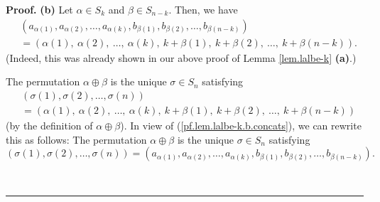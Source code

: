\documentclass
[numbers=enddot,12pt,final,onecolumn,notitlepage,english]{scrartcl}%
\theoremstyle{definition}
\newenvironment{proof}[1][Proof]{\noindent\textbf{#1.} }{\ \rule{0.5em}{0.5em}}
\newenvironment{verlong}{}{}
\begin{document}
\begin{verlong}
\begin{proof}
\textbf{(b)} Let $\alpha\in S_{k}$ and $\beta\in S_{n-k}$. Then, we have%
\begin{align}
&  \left(  a_{\alpha\left(  1\right)  },a_{\alpha\left(  2\right)  }%
,\ldots,a_{\alpha\left(  k\right)  },b_{\beta\left(  1\right)  }%
,b_{\beta\left(  2\right)  },\ldots,b_{\beta\left(  n-k\right)  }\right)
\nonumber\\
&  =\left(  \alpha\left(  1\right)  ,\ \alpha\left(  2\right)  ,\ \ldots
,\ \alpha\left(  k\right)  ,\ k+\beta\left(  1\right)  ,\ k+\beta\left(
2\right)  ,\ \ldots,\ k+\beta\left(  n-k\right)  \right)  .
\label{pf.lem.lalbe-k.b.concats}%
\end{align}
(Indeed, this was already shown in our above proof of Lemma \ref{lem.lalbe-k}
\textbf{(a)}.)

The permutation $\alpha\oplus\beta$ is the unique $\sigma\in S_{n}$ satisfying%
\begin{align*}
&  \left(  \sigma\left(  1\right)  ,\sigma\left(  2\right)  ,\ldots
,\sigma\left(  n\right)  \right) \\
&  =\left(  \alpha\left(  1\right)  ,\ \alpha\left(  2\right)  ,\ \ldots
,\ \alpha\left(  k\right)  ,\ k+\beta\left(  1\right)  ,\ k+\beta\left(
2\right)  ,\ \ldots,\ k+\beta\left(  n-k\right)  \right)
\end{align*}
(by the definition of $\alpha\oplus\beta$). In view of
(\ref{pf.lem.lalbe-k.b.concats}), we can rewrite this as follows: The
permutation $\alpha\oplus\beta$ is the unique $\sigma\in S_{n}$ satisfying%
\[
\left(  \sigma\left(  1\right)  ,\sigma\left(  2\right)  ,\ldots,\sigma\left(
n\right)  \right)  =\left(  a_{\alpha\left(  1\right)  },a_{\alpha\left(
2\right)  },\ldots,a_{\alpha\left(  k\right)  },b_{\beta\left(  1\right)
},b_{\beta\left(  2\right)  },\ldots,b_{\beta\left(  n-k\right)  }\right)  .
\]



\end{proof}
\end{verlong}
\end{document}
